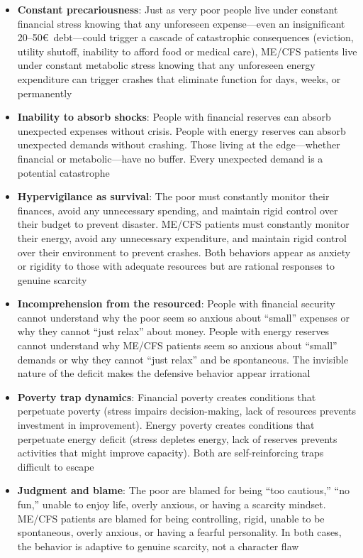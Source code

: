 \begin{itemize}
    \item \textbf{Constant precariousness}: Just as very poor people live under constant financial stress knowing that any unforeseen expense---even an insignificant 20--50\euro\ debt---could trigger a cascade of catastrophic consequences (eviction, utility shutoff, inability to afford food or medical care), ME/CFS patients live under constant metabolic stress knowing that any unforeseen energy expenditure can trigger crashes that eliminate function for days, weeks, or permanently

    \item \textbf{Inability to absorb shocks}: People with financial reserves can absorb unexpected expenses without crisis. People with energy reserves can absorb unexpected demands without crashing. Those living at the edge---whether financial or metabolic---have no buffer. Every unexpected demand is a potential catastrophe

    \item \textbf{Hypervigilance as survival}: The poor must constantly monitor their finances, avoid any unnecessary spending, and maintain rigid control over their budget to prevent disaster. ME/CFS patients must constantly monitor their energy, avoid any unnecessary expenditure, and maintain rigid control over their environment to prevent crashes. Both behaviors appear as anxiety or rigidity to those with adequate resources but are rational responses to genuine scarcity

    \item \textbf{Incomprehension from the resourced}: People with financial security cannot understand why the poor seem so anxious about ``small'' expenses or why they cannot ``just relax'' about money. People with energy reserves cannot understand why ME/CFS patients seem so anxious about ``small'' demands or why they cannot ``just relax'' and be spontaneous. The invisible nature of the deficit makes the defensive behavior appear irrational

    \item \textbf{Poverty trap dynamics}: Financial poverty creates conditions that perpetuate poverty (stress impairs decision-making, lack of resources prevents investment in improvement). Energy poverty creates conditions that perpetuate energy deficit (stress depletes energy, lack of reserves prevents activities that might improve capacity). Both are self-reinforcing traps difficult to escape

    \item \textbf{Judgment and blame}: The poor are blamed for being ``too cautious,'' ``no fun,'' unable to enjoy life, overly anxious, or having a scarcity mindset. ME/CFS patients are blamed for being controlling, rigid, unable to be spontaneous, overly anxious, or having a fearful personality. In both cases, the behavior is adaptive to genuine scarcity, not a character flaw
\end{itemize}

